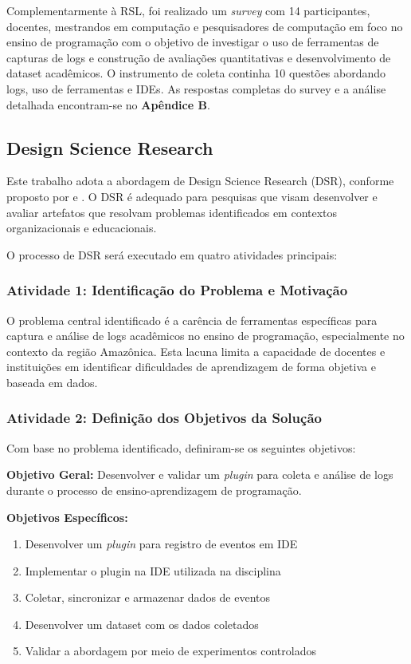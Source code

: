 Complementarmente à RSL, foi realizado um \textit{survey} com 14 participantes, docentes, mestrandos em computação e pesquisadores de computação em foco no ensino de programação com o objetivo de investigar o uso de ferramentas de capturas de logs e construção de avaliações quantitativas e desenvolvimento de dataset acadêmicos. O instrumento de coleta continha 10 questões abordando logs, uso de ferramentas e IDEs. As respostas completas do survey e a análise detalhada encontram-se no \textbf{Apêndice B}.

\subsection{Design Science Research}
\label{subsec:dsr}

Este trabalho adota a abordagem de Design Science Research (DSR), conforme proposto por \cite{peffers2007design} e \cite{hevner2004design}. O DSR é adequado para pesquisas que visam desenvolver e avaliar artefatos que resolvam problemas identificados em contextos organizacionais e educacionais.

O processo de DSR será executado em quatro atividades principais:

\subsubsection{Atividade 1: Identificação do Problema e Motivação}
\label{subsubsec:problema-motivacao}

O problema central identificado é a carência de ferramentas específicas para captura e análise de logs acadêmicos no ensino de programação, especialmente no contexto da região Amazônica. Esta lacuna limita a capacidade de docentes e instituições em identificar dificuldades de aprendizagem de forma objetiva e baseada em dados.

\subsubsection{Atividade 2: Definição dos Objetivos da Solução}
\label{subsubsec:objetivos-solucao}

Com base no problema identificado, definiram-se os seguintes objetivos:

\textbf{Objetivo Geral:}
Desenvolver e validar um \textit{plugin} para coleta e análise de logs durante o processo de ensino-aprendizagem de programação.

\textbf{Objetivos Específicos:}
\begin{enumerate}
    \item Desenvolver um \textit{plugin} para registro de eventos em IDE
    \item Implementar o plugin na IDE utilizada na disciplina
    \item Coletar, sincronizar e armazenar dados de eventos
    \item Desenvolver um dataset com os dados coletados
    \item Validar a abordagem por meio de experimentos controlados
\end{enumerate}

